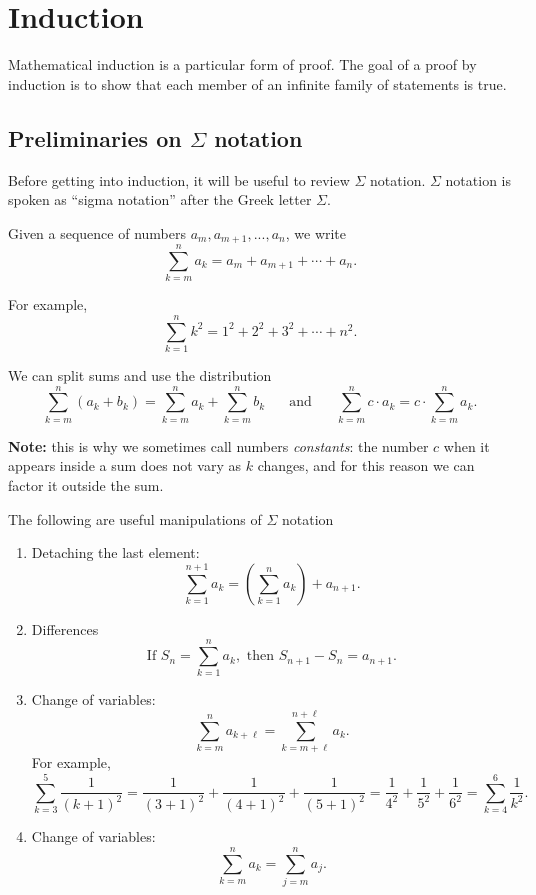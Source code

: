 \documentclass[11pt,dvipsnames]{book}
\numberwithin{equation}{section} %
\numberwithin{figure}{section} %
\numberwithin{table}{section} %
\begin{document}

\chapter{Induction}


Mathematical induction is a particular form of proof.
The goal of a proof by induction is to show that each member of an infinite family of statements is true.

\section{Preliminaries on $\Sigma$ notation}

Before getting into induction, it will be useful to review $\Sigma$ notation. 
$\Sigma$ notation is spoken as ``sigma notation'' after the Greek letter $\Sigma$.
\begin{definition}
Given a sequence of numbers $a_{m},a_{m+1},...,a_{n}$, we write
\[
\sum_{k=m}^{n} a_{k} = a_{m}+a_{m+1}+\cdots +a_{n}.
\]
\end{definition}
For example, 
\[
\sum_{k=1}^{n} k^2 = 1^2+2^2+3^2+\cdots + n^2.
\]

We can split sums and use the distribution \[\sum_{k=m}^{n} (a_{k} +b_{k})=\sum_{k=m}^{n} a_{k} +\sum_{k=m}^{n} b_{k}\;\; \;\;\; \mbox{ and }\;\;\;\;\; \sum_{k=m}^{n} c\cdot a_{k} =c\cdot \sum_{k=m}^{n} a_{k} .
\]

{\bf Note:} this is why we sometimes call numbers {\it constants}: the number $c$ when it appears inside a sum does not vary as $k$ changes, and for this reason we can factor it outside the sum.

The following are useful manipulations of $\Sigma$ notation
\begin{enumerate}
\item Detaching the last element:
\[ \sum_{k=1}^{n+1} a_k = \left(\sum_{k=1}^{n} a_k\right) + a_{n+1}.\]
\item Differences
\[ \mbox{If } S_n=\sum_{k=1}^{n} a_k, \mbox{ then } S_{n+1}-S_n = a_{n+1}.\]
\item Change of variables:
\[
\sum_{k=m}^{n} a_{k+\ell} =\sum_{k=m+\ell}^{n+\ell} a_{k}.
\]
For example,
\[
\sum_{k=3}^{5} \frac{1}{(k+1)^2}
=\frac{1}{(3+1)^2}+\frac{1}{(4+1)^2}+\frac{1}{(5+1)^2}
=\frac{1}{4^2}+\frac{1}{5^2}+\frac{1}{6^2} = \sum_{k=4}^{6} \frac{1}{k^2}.
\]
\item Change of variables:
\[
\sum_{k=m}^{n} a_{k} =\sum_{j=m}^{n} a_{j}.
\]
\end{enumerate}
\end{document}
